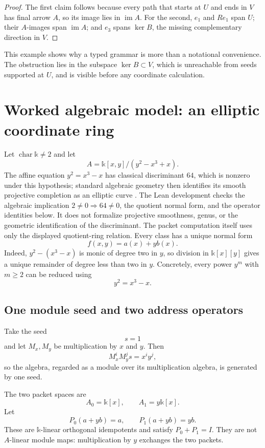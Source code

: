 \documentclass[11pt]{article}
\theoremstyle{definition}
\theoremstyle{remark}
\newcommand{\im}{\operatorname{im}}
\newcommand{\bbk}{\mathbb{k}}
\begin{document}
\begin{proof}
The first claim follows because every path that starts at $U$ and ends in $V$ has final arrow $A$, so its image lies in $\im A$. For the second, $e_1$ and $Re_1$ span $U$; their $A$-images span $\im A$; and $e_3$ spans $\ker B$, the missing complementary direction in $V$.
\end{proof}

This example shows why a typed grammar is more than a notational convenience. The obstruction lies in the subspace $\ker B\subset V$, which is unreachable from seeds supported at $U$, and is visible before any coordinate calculation.

\section{Worked algebraic model: an elliptic coordinate ring}

Let $\operatorname{char}\bbk\ne2$ and let
\[
A=\bbk[x,y]/(y^2-x^3+x).
\]
The affine equation $y^2=x^3-x$ has classical discriminant $64$, which is nonzero under this hypothesis; standard algebraic geometry then identifies its smooth projective completion as an elliptic curve \cite[Ch.~III]{silverman2009}. The Lean development checks the algebraic implication $2\ne0\Rightarrow64\ne0$, the quotient normal form, and the operator identities below. It does not formalize projective smoothness, genus, or the geometric identification of the discriminant. The packet computation itself uses only the displayed quotient-ring relation.
Every class has a unique normal form
\[
f(x,y)=a(x)+y b(x).
\]
Indeed, $y^2-(x^3-x)$ is monic of degree two in $y$, so division in $\bbk[x][y]$ gives a unique remainder of degree less than two in $y$. Concretely, every power $y^m$ with $m\ge2$ can be reduced using
\[
y^2=x^3-x.
\]

\subsection{One module seed and two address operators}

Take the seed
\[
s=1
\]
and let $M_x,M_y$ be multiplication by $x$ and $y$. Then
\[
M_x^iM_y^js=x^iy^j,
\]
so the algebra, regarded as a module over its multiplication algebra, is generated by one seed.

The two packet spaces are
\[
A_0=\bbk[x],
\qquad
A_1=y\bbk[x].
\]
Let
\[
P_0(a+yb)=a,
\qquad
P_1(a+yb)=yb.
\]
These are $\bbk$-linear orthogonal idempotents and satisfy $P_0+P_1=I$. They are not $A$-linear module maps: multiplication by $y$ exchanges the two packets.
\end{document}
